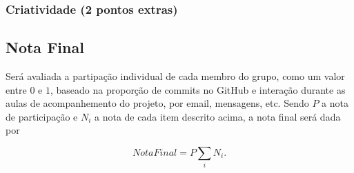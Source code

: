 \documentclass[11pt]{article}
\begin{document}
\subsubsection{Criatividade (2 pontos extras)}
\label{sec:org472588a}
\subsection{Nota Final}
\label{sec:orgcae9fcf}

Será avaliada a partipação individual de cada membro do grupo, como um
valor entre \(0\) e \(1\), baseado na proporção de commits no GitHub e
interação durante as aulas de acompanhemento do projeto, por email,
mensagens, etc. Sendo \(P\) a nota de participação e \(N_i\) a nota de cada
item descrito acima, a nota final será dada por

\[\mathit{NotaFinal} = P \sum_i N_i.\]
\end{document}
